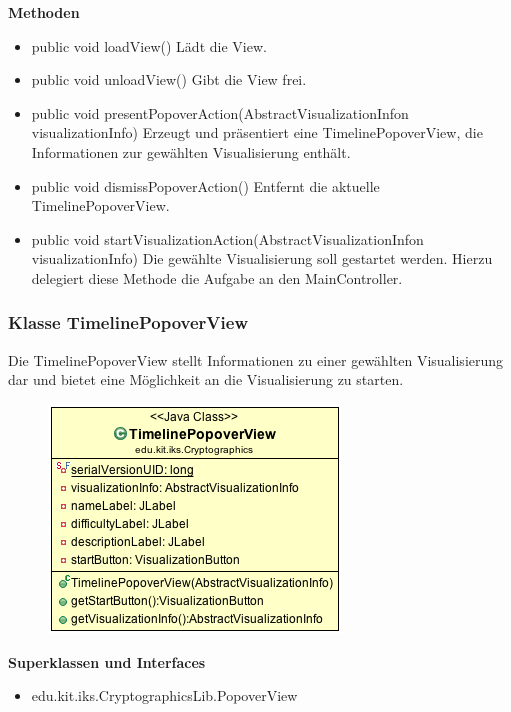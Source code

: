 \documentclass{article}
\begin{document}
      \textbf{Methoden}
      \begin{itemize}
        \item public void loadView() \newline
        Lädt die View.
        \item public void unloadView() \newline
        Gibt die View frei.
        \item public void presentPopoverAction(AbstractVisualizationInfon visualizationInfo) \newline
        Erzeugt und präsentiert eine TimelinePopoverView, die Informationen zur gewählten Visualisierung enthält.
        \item public void dismissPopoverAction() \newline
        Entfernt die aktuelle TimelinePopoverView.
        \item public void startVisualizationAction(AbstractVisualizationInfon visualizationInfo) \newline
        Die gewählte Visualisierung soll gestartet werden. Hierzu delegiert diese Methode die Aufgabe an den MainController.
      \end{itemize}

      

    \subsubsection{Klasse TimelinePopoverView}
      Die TimelinePopoverView stellt Informationen zu einer gewählten Visualisierung dar und bietet eine Möglichkeit an die Visualisierung zu starten.
      \begin{figure}[H]
        \centering
        \includegraphics{resources/edu-kit-iks-Cryptographics-TimelinePopoverView}
      \end{figure}

      \textbf{Superklassen und Interfaces}
      \begin{itemize}
        \item edu.kit.iks.CryptographicsLib.PopoverView
      \end{itemize}
      
\end{document}
